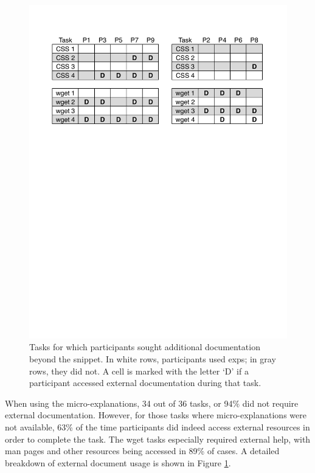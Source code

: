 \begin{figure}
\centering
\includegraphics[width=\columnwidth]{figures/doc_accesses}
\caption{
Tasks for which participants sought additional documentation beyond the snippet. In white rows, participants used \glspl{exp}; in gray rows, they did not.
A cell is marked with the letter `D' if a participant accessed external documentation during that task.
}
\label{fig:doc_accesses}
\end{figure}

When using the micro-explanations, 34 out of 36 tasks, or 94\% did not require external documentation.  However, for those tasks where micro-explanations were not available, 63\% of the time participants did indeed access external resources in order to complete the task.  The wget tasks especially required external help, with man pages and other resources being accessed in 89\% of cases.  
A detailed breakdown of external document usage is shown in Figure \ref{fig:doc_accesses}. 



